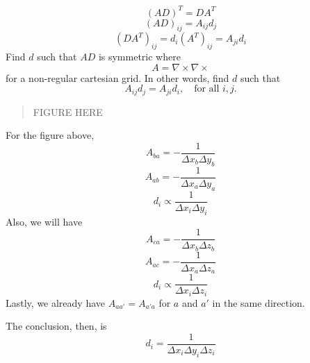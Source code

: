 \documentclass{article}
\newcommand{\BE}{\begin{equation}}
\newcommand{\EE}{\end{equation}}
\newcommand{\D}{\Delta}
\begin{document}
\BE (AD)^T = DA^T \EE
\BE (AD)_{ij} = A_{ij} d_j \EE
\BE (DA^T)_{ij} = d_i (A^T)_{ij} = A_{ji} d_i \EE
Find $d$ such that $AD$ is symmetric where 
\BE A = \nabla \times \nabla \times \EE
for a non-regular cartesian grid.
In other words, find $d$ such that
\BE A_{ij} d_j = A_{ji} d_i, \quad \text{for all $i, j$.} \EE
\begin{quote} FIGURE HERE \end{quote}
For the figure above,
\BE A_{ba} = -\frac{1}{\D x_b \D y_b} \EE
\BE A_{ab} = -\frac{1}{\D x_a \D y_a} \EE
\BE d_i \propto \frac{1}{\D x_i \D y_i} \EE
Also, we will have
\BE A_{ca} = -\frac{1}{\D x_b \D z_b} \EE
\BE A_{ac} = -\frac{1}{\D x_a \D z_a} \EE
\BE d_i \propto \frac{1}{\D x_i \D z_i} \EE
Lastly, we already have $A_{aa'} = A_{a'a}$ 
    for $a$ and $a'$ in the same direction.

The conclusion, then, is
\BE d_i = \frac{1}{\D x_i \D y_i \D z_i} \EE
\end{document}
